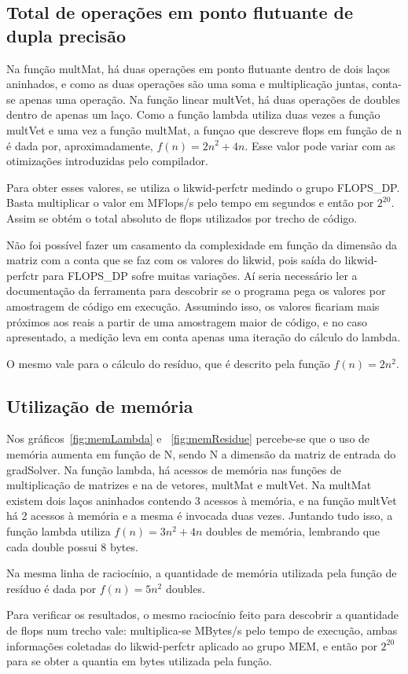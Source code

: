 \documentclass[12pt]{article}
\begin{document}
\clearpage

\subsection{Total de operações em ponto flutuante de dupla precisão}\label{sec:flopOp}

Na função multMat, há duas operações em ponto flutuante dentro de dois laços
aninhados, e como as duas operações são uma soma e multiplicação juntas,
conta-se apenas uma operação. Na função linear multVet, há duas operações de
doubles dentro de apenas um laço. Como a função lambda utiliza duas vezes a
função multVet e uma vez a função multMat, a funçao que descreve flops em função
de n é dada por, aproximadamente, $f(n) = 2n^2 + 4n$. Esse valor pode variar com
as otimizações introduzidas pelo compilador.

Para obter esses valores, se utiliza o likwid-perfctr medindo o grupo FLOPS\_DP.
Basta multiplicar o valor em MFlops/s pelo tempo em segundos e então por
$2^{20}$. Assim se obtém o total absoluto de flops utilizados por trecho de
código.

Não foi possível fazer um casamento da complexidade em função da dimensão da
matriz com a conta que se faz com os valores do likwid, pois saída do
likwid-perfctr para FLOPS\_DP sofre muitas variações. Aí seria necessário ler a
documentação da ferramenta  para descobrir se o programa pega os valores por
amostragem de código em execução. Assumindo isso, os valores ficariam mais
próximos aos reais a partir de uma amostragem maior de código, e no caso
apresentado, a medição leva em conta apenas uma iteração do cálculo do lambda.

O mesmo vale para o cálculo do resíduo, que é descrito pela função $f(n) =
2n^2$.

\subsection{Utilização de memória}\label{sec:utilizacaoMemoria}

Nos gráficos~\ref{fig:memLambda} e ~\ref{fig:memResidue} percebe-se que o uso de
memória aumenta em função de N, sendo N a dimensão da matriz de entrada do
gradSolver. Na função lambda, há acessos de memória nas funções de multiplicação
de matrizes e na de vetores, multMat e multVet. Na multMat existem dois laços
aninhados contendo 3 acessos à memória, e na função multVet há 2 acessos à
memória e a mesma é invocada duas vezes. Juntando tudo isso, a função lambda
utiliza $f(n) = 3n^2 + 4n$ doubles de memória, lembrando que cada double possui
8 bytes.

Na mesma linha de raciocínio, a quantidade de memória utilizada pela função de
resíduo é dada por $f(n) = 5n^2$ doubles.

Para verificar os resultados, o mesmo raciocínio feito para descobrir a
quantidade de flops num trecho vale: multiplica-se MBytes/s pelo tempo de
execução, ambas informações coletadas do likwid-perfctr aplicado ao grupo MEM, e
então por $2^{20}$ para se obter a quantia em bytes utilizada pela função.
\end{document}
